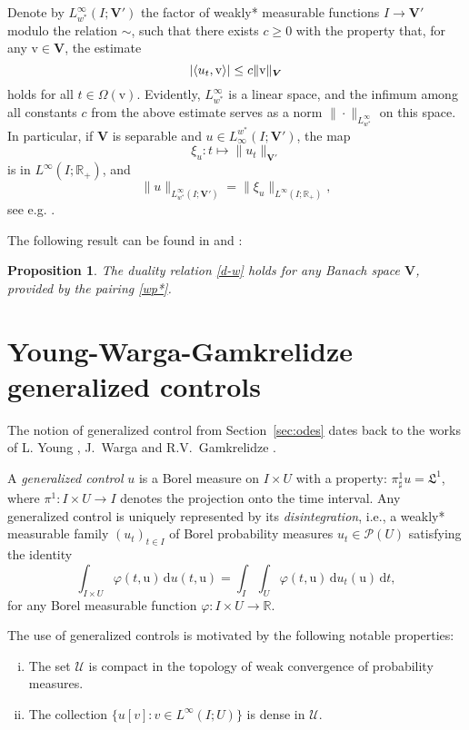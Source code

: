 \documentclass[sn-mathphys-num]{sn-jnl}
\numberwithin{equation}{section}
\theoremstyle{mythm}
\newtheorem{proposition}{Proposition}[section]
\theoremstyle{mydef}
\renewcommand{\phi}{\varphi}
\newcommand{\R}{\mathbb{R}}
\begin{document}
Denote by ${L}^\infty_{w^*}(I; \bm V')$ the factor of weakly* measurable functions $I \to \bm V'$ modulo the relation $\sim$, such that there exists $c \geq 0$ with the property that, for any $\mathrm v \in \bm V$, the estimate
\[
\left|\langle u_t, \mathrm v\rangle\right| \leq c\|{\rm v}\|_{\bm V}
\]
holds for all $t\in \Omega(\mathrm v)$. Evidently, ${L}^\infty_{w^*}$ is a linear space, and the infimum among all constants $c$ from the above estimate serves as a norm $\|\cdot\|_{{L}^\infty_{w^*}}$ on this space. In particular, if $\bm V$ is separable and $u \in {L}_\infty^{w^*}(I; \bm V')$, the map \[\xi_u \colon t \mapsto \|u_t\|_{\bm V'}\] is in ${L}^\infty(I; \R_+)$, and
\[\|u\|_{{L}^\infty_{w^*}(I; \bm V')} = \|\xi_u\|_{L^\infty(I; \R_+)},\] see e.g. \cite[Remark~10.1.15]{papageorgiou2009handbook}.
 
The following result can be found in \cite[p. 95]{tulcea1969} and \cite[Theorem~10.1.16]{papageorgiou2009handbook}:
\begin{proposition}
The duality relation \eqref{d-w} holds for any Banach space $\bm V$, provided by the pairing \eqref{wp*}.
\end{proposition}

\section{Young-Warga-Gamkrelidze generalized controls}\label{appe:GenU}

The notion of generalized control from Section~\ref{sec:odes} dates back to the works of L. Young \cite{young1969}, J.~Warga \cite{warga1972optimal} and R.V.~Gamkrelidze \cite{Gamkrelidze1978}. 

A \emph{generalized control} \( u \) is a Borel measure on \( I \times U \) with a property: \( \pi^1_\sharp u = \mathfrak{L}^1 \), where \( \pi^1 \colon I \times U \to I \) denotes the projection onto the time interval.  
Any generalized control is uniquely represented by its \emph{disintegration}, i.e., a weakly* measurable family \( (u_t)_{t \in I} \) of Borel probability measures \( u_t \in \mathcal{P}(U) \) satisfying the identity 
\[
\int_{I \times U} \phi(t,\mathrm{u}) \, \mathrm{d} u(t,\mathrm{u}) = \int_I \int_U \phi(t,\mathrm{u}) \, \mathrm{d} u_t(\mathrm{u}) \, \mathrm{d}t,
\]
for any Borel measurable function \( \phi \colon I \times U \to \mathbb{R} \). 


The use of generalized controls is motivated by the following notable properties: 
\begin{enumerate}[i)]
    \item The set \( {\mathcal{U}} \) is compact in the topology of weak convergence of probability measures.

    \item The collection \( \{u[v] \colon v \in L^\infty(I;U)\} \) is dense in \( {\mathcal{U}} \).
\end{enumerate}
\end{document}
